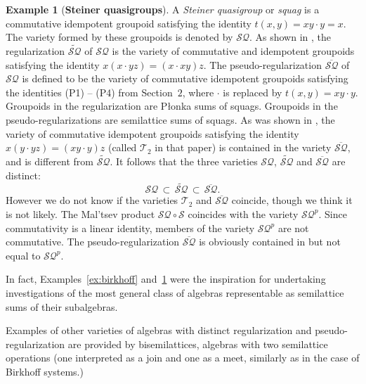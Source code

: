 \documentclass{birkau}
\newcommand{\mc}{\mathcal}
\newcommand{\mcS}{\mathcal{S}}
\def\wt{\widetilde}
\newcommand{\pro}[1]{{#1}^p}
\theoremstyle{plain}
\theoremstyle{definition}
\newtheorem{example}[theorem]{Example}
\numberwithin{equation}{section}
\begin{document}
\begin{example}[\textbf{Steiner quasigroups}]\label{ex:steiner}
  A \emph{Steiner quasigroup} or \emph{squag} is a commutative idempotent groupoid
  satisfying the identity $t(x,y) = xy \cdot y = x$. The variety formed by these groupoids
  is denoted by $\mc{SQ}$. As shown in \cite{BF15}, the regularization $\wt{\mc{SQ}}$ of
  $\mc{SQ}$ is the variety of commutative and idempotent groupoids
  satisfying the identity $x (x \cdot yz) = (x \cdot xy) z$. The pseudo-regularization
  $\overline{\mc{SQ}}$ of $\mc{SQ}$ is defined to be the variety of commutative idempotent groupoids
  satisfying the identities (P1) -- (P4) from Section~$2$, where $\cdot$ is replaced by
  $t(x,y) = xy \cdot y$. Groupoids in the regularization are P\l onka sums of
  squags. Groupoids in the pseudo-regularizations are semilattice sums of squags. As was
  shown in \cite{BF15}, the variety of commutative idempotent groupoids
  satisfying the identity $x (y \cdot yz) = (xy \cdot y) z$ (called $ \mathcal{T}_2$ in
  that paper) is contained in the variety
  $\overline{\mc{SQ}}$, and is different from $ \wt{\mc{SQ}}$. It follows
  that the three varieties $\mc{SQ}$, $\wt{\mc{SQ}}$ and $\overline{\mc{SQ}}$ are
  distinct:
  \begin{equation*}
\mc{SQ} \, \subset \, \wt{\mc{SQ}} \, \subset \, \overline{\mc{SQ}}.
\end{equation*}
However we do not know if the varieties $\mathcal{T}_2$ and $\overline{\mc{SQ}}$ coincide,
though we think it is not likely. The Mal'tsev product $\mc{SQ} \circ \mcS$ coincides with
the variety $\pro{\mc{SQ}}$.  Since commutativity is a linear identity, members of the
variety $\pro{\mc{SQ}}$ are not commutative. The pseudo-regularization
$\overline{\mc{SQ}}$ is obviously contained in but not equal to $\pro{\mc{SQ}}$.
\end{example}

In fact, Examples~\ref{ex:birkhoff} and~\ref{ex:steiner} were the inspiration for
undertaking investigations of the most general class of algebras representable as
semilattice sums of their subalgebras.

Examples of other varieties of algebras with distinct regularization and
pseudo-regularization are provided by bisemilattices, algebras with two semilattice
operations (one interpreted as a join and one as a meet, similarly as in the case of
Birkhoff systems.) 
\end{document}
